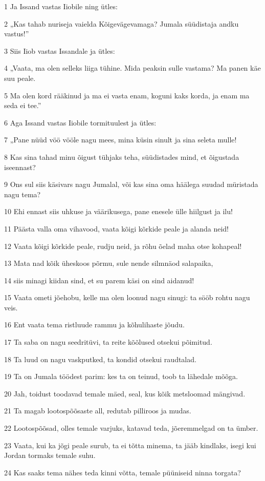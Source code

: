 \par 1 Ja Issand vastas Iiobile ning ütles:
\par 2 „Kas tahab nuriseja vaielda Kõigevägevamaga? Jumala süüdistaja andku vastus!”
\par 3 Siis Iiob vastas Issandale ja ütles:
\par 4 „Vaata, ma olen selleks liiga tühine. Mida peaksin sulle vastama? Ma panen käe suu peale.
\par 5 Ma olen kord rääkinud ja ma ei vasta enam, koguni kaks korda, ja enam ma seda ei tee.”
\par 6 Aga Issand vastas Iiobile tormituulest ja ütles:
\par 7 „Pane nüüd vöö vööle nagu mees, mina küsin sinult ja sina seleta mulle!
\par 8 Kas sina tahad minu õigust tühjaks teha, süüdistades mind, et õigustada iseennast?
\par 9 Ons sul siis käsivars nagu Jumalal, või kas sina oma häälega suudad müristada nagu tema?
\par 10 Ehi ennast siis uhkuse ja väärikusega, pane enesele ülle hiilgust ja ilu!
\par 11 Päästa valla oma vihavood, vaata kõigi kõrkide peale ja alanda neid!
\par 12 Vaata kõigi kõrkide peale, rudju neid, ja rõhu õelad maha otse kohapeal!
\par 13 Mata nad kõik üheskoos põrmu, sule nende silmnäod salapaika,
\par 14 siis minagi kiidan sind, et su parem käsi on sind aidanud!
\par 15 Vaata ometi jõehobu, kelle ma olen loonud nagu sinugi: ta sööb rohtu nagu veis.
\par 16 Ent vaata tema ristluude rammu ja kõhulihaste jõudu.
\par 17 Ta saba on nagu seedritüvi, ta reite kõõlused otsekui põimitud.
\par 18 Ta luud on nagu vaskputked, ta kondid otsekui raudtalad.
\par 19 Ta on Jumala töödest parim: kes ta on teinud, toob ta lähedale mõõga.
\par 20 Jah, toidust toodavad temale mäed, seal, kus kõik metsloomad mängivad.
\par 21 Ta magab lootospõõsaste all, redutab pilliroos ja mudas.
\par 22 Lootospõõsad, olles temale varjuks, katavad teda, jõeremmelgad on ta ümber.
\par 23 Vaata, kui ka jõgi peale surub, ta ei tõtta minema, ta jääb kindlaks, isegi kui Jordan tormaks temale suhu.
\par 24 Kas saaks tema nähes teda kinni võtta, temale püüniseid ninna torgata?

